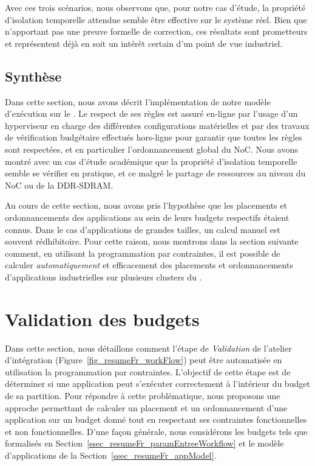\documentclass[main.tex]{subfiles}
\begin{document}
Avec ces trois scénarios, nous observons que, pour notre cas d'étude, la propriété d'isolation temporelle attendue semble être effective sur le système réel. Bien que n'apportant pas une preuve formelle de correction, ces résultats sont prometteurs et représentent déjà en soit un intérêt certain d'un point de vue industriel.

\subsection{Synthèse}
Dans cette section, nous avons décrit l'implémentation de notre modèle d'exécution sur le \mppalong. Le respect de ses règles est assuré en-ligne par l'usage d'un hyperviseur en charge des différentes configurations matérielles et par des travaux de vérification budgétaire effectués hors-ligne pour garantir que toutes les règles sont respectées, et en particulier l'ordonnancement global du NoC. Nous avons montré avec un cas d'étude académique que la propriété d'isolation temporelle semble se vérifier en pratique, et ce malgré le partage de ressources au niveau du NoC ou de la DDR-SDRAM.

Au cours de cette section, nous avons pris l'hypothèse que les placements et ordonnancements des applications au sein de leurs budgets respectifs étaient connus. Dans le cas d'applications de grandes tailles, un calcul manuel est souvent rédhibitoire. Pour cette raison, nous montrons dans la section suivante comment, en utilisant la programmation par contraintes, il est possible de calculer \emph{automatiquement} et efficacement des placements et ordonnancements d'applications industrielles sur plusieurs clusters du \mppalong. 


\section{Validation des budgets}
\label{sec_resumeFr_validation}
Dans cette section, nous détaillons comment l'étape de \emph{Validation} de l'atelier d'intégration (Figure~\ref{fig_resumeFr_workFlow}) peut être automatisée en utilisation la programmation par contraintes. L'objectif de cette étape est de déterminer si une application peut s'exécuter correctement à l'intérieur du budget de sa partition. Pour répondre à cette problématique, nous proposons une approche permettant de calculer un placement et un ordonnancement d'une application sur un budget donné tout en respectant ses contraintes fonctionnelles et non fonctionnelles. D'une façon générale, nous considérons les budgets tels que formalisés en Section~\ref{ssec_resumeFr_paramEntreeWorkflow} et le modèle d'applications de la Section~\ref{ssec_resumeFr_appModel}.
\end{document}
